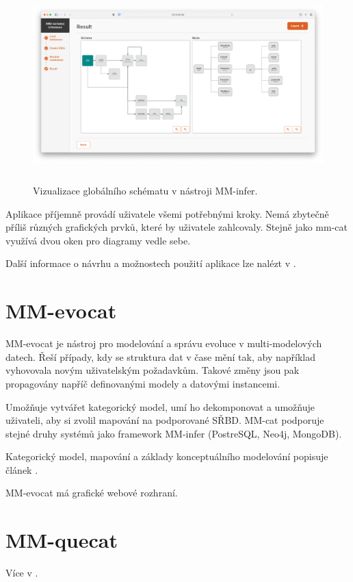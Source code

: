 \begin{figure}[htb]
  \centering
  \includegraphics[height=75mm]{../img/mm-infer-result}
  \caption{Vizualizace globálního schématu v nástroji MM-infer.}
  \label{obr01:mm-infer-result}
\end{figure}

Aplikace příjemně provádí uživatele všemi potřebnými kroky. Nemá zbytečně příliš různých grafických prvků, které by uživatele zahlcovaly. Stejně jako mm-cat využívá dvou oken pro diagramy vedle sebe.

Další informace o návrhu a možnostech použití aplikace lze nalézt v \cite{MM_infer}.

\section{MM-evocat}

MM-evocat je nástroj pro modelování a správu evoluce v multi-modelových datech. Řeší případy, kdy se struktura dat v čase mění tak, aby například vyhovovala novým uživatelským požadavkům. Takové změny jsou pak propagovány napříč definovanými modely a datovými instancemi.

Umožňuje vytvářet kategorický model, umí ho dekomponovat a umožňuje uživateli, aby si zvolil mapování na podporované SŘBD. MM-cat podporuje stejné druhy systémů jako framework MM-infer (PostreSQL, Neo4j, MongoDB).

Kategorický model, mapování a základy konceptuálního modelování popisuje článek \cite{MM_evocat}.

MM-evocat má grafické webové rozhraní.


\section{MM-quecat}

Více v \cite{MM_quecat}.



